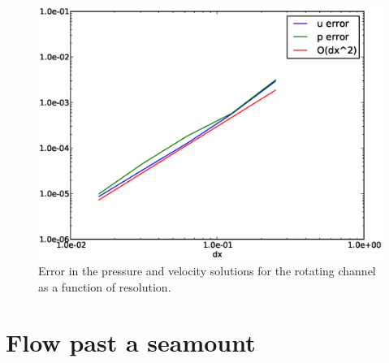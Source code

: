 \begin{figure}[ht]
  \centering
  \onlypdf{\begin{pdfdisplay}}
    \includegraphics[width=1.1\textwidth]{examples_images/rotating_channel/convergence.eps}
  \onlypdf{\end{pdfdisplay}}  
  \caption{Error in the pressure and velocity solutions for the rotating channel as a function of resolution.}
  \label{fig:periodic_channel_error}
\end{figure}




\section{Flow past a seamount}
\label{sect:seamount}

